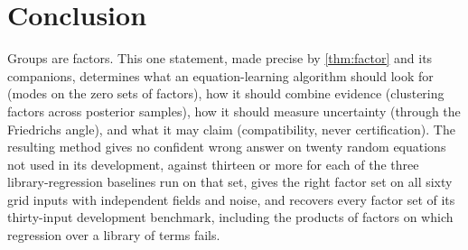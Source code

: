 \section{Conclusion}\label{sec:conclusion}
Groups are factors. This one statement, made precise by \cref{thm:factor} and its companions, determines what an
equation-learning algorithm should look for (modes on the zero sets of factors), how it should combine evidence
(clustering factors across posterior samples), how it should measure uncertainty (through the Friedrichs angle), and
what it may claim (compatibility, never certification). The resulting method gives no confident wrong answer on twenty random equations not used in its
development, against thirteen or more for each of the three library-regression baselines run on that set, gives the right factor
set on all sixty grid inputs with independent fields and noise, and recovers every factor set of its
thirty-input development benchmark, including the products of factors on which regression over a library of terms fails.
